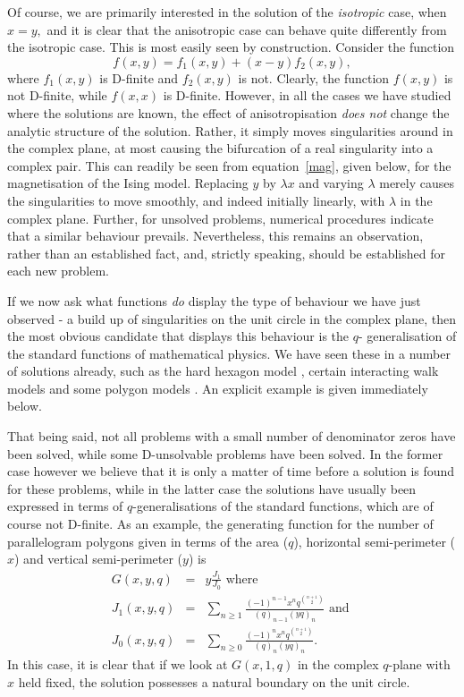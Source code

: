 Of course, we are primarily interested in the solution of the 
{\em isotropic} case, when $x = y,$ and it is clear that the
anisotropic case can behave quite differently from the isotropic
case. This is most easily seen by construction. Consider the
function
\begin{equation}
f(x,y) = f_1(x,y) + (x-y)f_2(x,y),
\end{equation}
where $f_1(x,y)$ is D-finite and $f_2(x,y)$ is not. 
Clearly, the function $f(x,y)$ is not D-finite, while $f(x,x)$ is D-finite.
However, in all the cases we have studied where the solutions are known, 
the effect of anisotropisation {\em does not} change the analytic structure
of the solution. Rather, it simply moves singularities around in
the complex plane, at most causing the bifurcation of a real singularity
into a complex pair. This can readily be seen from equation~\ref{mag},
 given below,
for the magnetisation of the Ising model. Replacing $y$ by $\lambda x$ and
varying $\lambda$ merely causes the singularities to move smoothly,
and indeed initially linearly, with $\lambda$ in the complex plane.
Further, for unsolved problems, numerical procedures indicate that
a similar behaviour prevails. Nevertheless, this remains an observation,
rather than an established fact, and, strictly speaking, should
be established for each new problem.

If we now ask what functions {\em do} display the type of behaviour
we have just observed - a build up of singularities on the unit
circle in the complex plane, then
the most obvious candidate that displays this behaviour is the $q$-
generalisation of the standard functions of mathematical physics. We
have seen these in a number of solutions already, such as the hard
hexagon model \cite{BHH}, certain interacting walk models \cite{OP}
and some polygon models \cite{BM}. 
An explicit example is given immediately below.

That being said, not all problems with a small number of
denominator zeros have been solved, while some D-unsolvable
problems have been solved. In the former case however we
believe that it is only a matter of time before a solution is found
for these problems, while in the latter case the solutions
have usually been expressed in terms of $q$-generalisations of the
standard functions, which are of course not D-finite.
As an example, the generating function for the
number of parallelogram polygons given
in terms of the area ($q$), horizontal semi-perimeter ($x$)
and vertical semi-perimeter ($y$) is \cite{BV92}
\begin{eqnarray}
G(x,y,q) &=& y\frac{J_1}{J_0} \mbox{  where} \\
J_1(x,y,q) &=& \sum_{n \ge 1} \frac{(-1)^{n-1}x^nq^{n+1 \choose
2}}{(q)_{n-1}(yq)_n} \mbox{ and }\\ 
J_0(x,y,q) &=& \sum_{n \ge 0} \frac{(-1)^nx^nq^{n+1 \choose
2}}{(q)_n(yq)_n}.
\end{eqnarray}
In this case, it is clear that if we look at $G(x,1,q)$ in the
complex $q$-plane with $x$ held fixed, the solution possesses a 
natural boundary on the unit circle.


